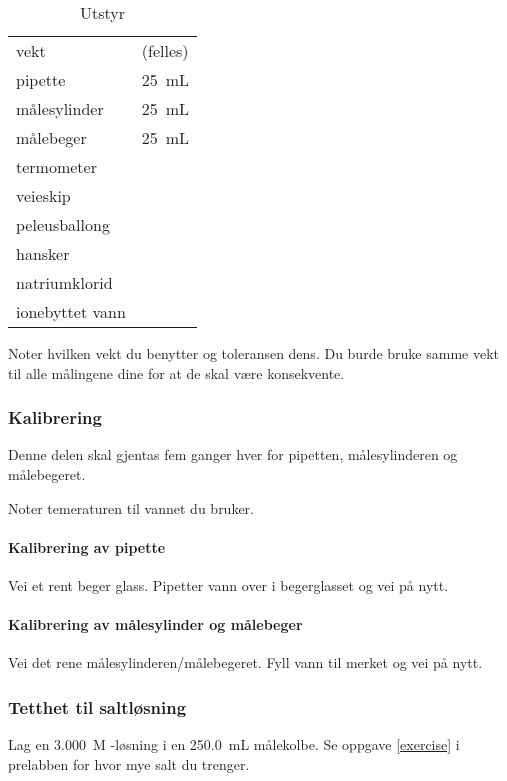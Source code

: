 \documentclass[hidelinks,12pt,norsk,a4paper,fleqn]{scrartcl}
\begin{document}
	\begin{table}[H]
		\caption{Utstyr}
		\begin{tabular}{ll}
			\toprule
			vekt & (felles) \\
			pipette & \SI{25}{mL} \\
			målesylinder & \SI{25}{mL} \\
			målebeger & \SI{25}{mL} \\
			termometer & \\
			veieskip & \\
			peleusballong & \\
			hansker & \\
			natriumklorid & \\
			ionebyttet vann & \\ \bottomrule 
		\end{tabular}
	\end{table}
	
	Noter hvilken vekt du benytter og toleransen dens. Du burde bruke samme vekt til alle målingene dine for at de skal være konsekvente.
	
	\subsubsection{Kalibrering}
	
	Denne delen skal gjentas fem ganger hver for pipetten, målesylinderen og målebegeret. 
	
	Noter temeraturen til vannet du bruker. 
	
	\paragraph{Kalibrering av pipette}
	Vei et rent beger glass. Pipetter vann over i begerglasset og vei på nytt.
	
	\paragraph{Kalibrering av målesylinder og målebeger}
	Vei det rene målesylinderen/målebegeret. Fyll vann til merket og vei på nytt.
	
	\subsubsection{Tetthet til saltløsning}
	Lag en \SI{3.000}{M} -løsning i en \SI{250.0}{mL} målekolbe. Se oppgave \ref{exercise} i prelabben for hvor mye salt du trenger. 
	
\end{document}
